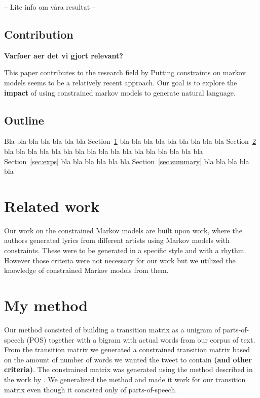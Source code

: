 \documentclass[a4paper,12pt]{article}
\begin{document}
-- Lite info om våra resultat --

   
\subsection{Contribution}
\textbf{Varfoer aer det vi gjort relevant?}

This paper contributes to the research field by 
Putting constraints on markov models seems to be a relatively recent approach. Our goal is to explore the \textbf{impact} of using constrained markov models to generate natural language.

\subsection{Outline}
Bla bla bla bla bla bla bla Section~\ref{sec:relwork} bla bla bla bla 
bla bla bla bla bla Section~\ref{sec:method} bla bla bla bla bla bla 
bla bla bla bla bla bla bla bla bla bla bla Section~\ref{sec:exps}
bla bla bla bla bla bla Section~\ref{sec:summary} bla bla bla bla bla

\section{Related work}
\label{sec:relwork}

Our work on the constrained Markov models are built upon \cite{McBarb} work, where the authors generated lyrics from different artists using Markov models with constraints. These were to be generated in a specific style and with a rhythm. However those criteria were not necessary for our work but we utilized the knowledge of constrained Markov models from them.



\section{My method}
\label{sec:method}



Our method consisted of building a transition matrix as a unigram of parts-of-speech (POS) together with a bigram with actual words from our corpus of text. From the transition matrix we generated a constrained transition matrix based on the amount of number of words we wanted the tweet to contain \textbf{(and other criteria)}. The constrained matrix was generated using the method described in the work by \cite{McBarb}. We generalized the method and made it work for our transition matrix even though it consisted only of parts-of-speech. 
\end{document}
